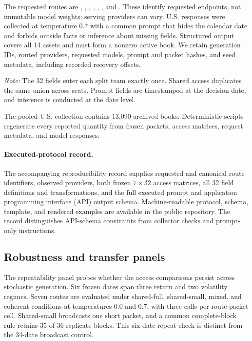 \documentclass[sigconf]{acmart}
\newcommand{\tabnote}[1]{\par\vspace{2pt}\noindent\begin{minipage}{\linewidth}\footnotesize\emph{Note:} #1\end{minipage}}
\begin{document}
The requested routes are , , , , , , and . These identify requested endpoints, not immutable model weights; serving providers can vary. U.S. responses were collected at temperature 0.7 with a common prompt that hides the calendar date and forbids outside facts or inference about missing fields. Structured output covers all 14 assets and must form a nonzero active book. We retain generation IDs, routed providers, requested models, prompt and packet hashes, and seed metadata, including recorded recovery offsets.

\begin{table}[!t]
\caption{The pooled U.S. protocol holds the research problem fixed.}
\label{tab:protocol}
\centering

\tabnote{The 32 fields enter each split team exactly once. Shared access duplicates the same union across seats. Prompt fields are timestamped at the decision date, and inference is conducted at the date level.}
\end{table}

The pooled U.S. collection contains 13,090 archived books. Deterministic scripts regenerate every reported quantity from frozen packets, access matrices, request metadata, and model responses.

\paragraph{Executed-protocol record.}
The accompanying reproducibility record supplies requested and canonical route identifiers, observed providers, both frozen $7\times32$ access matrices, all 32 field definitions and transformations, and the full executed prompt and application programming interface (API) output schema. Machine-readable protocol, schema, template, and rendered examples are available in the public repository. The record distinguishes API-schema constraints from collector checks and prompt-only instructions.

\subsection{Robustness and transfer panels}\label{sec:transferprotocol}
The repeatability panel probes whether the access comparisons persist across stochastic generation. Six frozen dates span three return and two volatility regimes. Seven routes are evaluated under shared-full, shared-small, mixed, and coherent conditions at temperatures 0.0 and 0.7, with three calls per route-packet cell. Shared-small broadcasts one short packet, and a common complete-block rule retains 35 of 36 replicate blocks. This six-date repeat check is distinct from the 34-date broadcast control.
\end{document}
